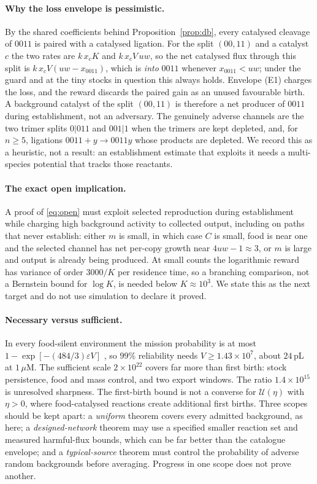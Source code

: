 \documentclass[11pt,letterpaper]{article}
\theoremstyle{plain}
\theoremstyle{definition}
\theoremstyle{remark}
\numberwithin{equation}{section}
\newcommand{\cU}{\mathcal U}
\newcommand{\eps}{\varepsilon}
\begin{document}
\paragraph{Why the loss envelope is pessimistic.}
By the shared coefficients behind Proposition~\ref{prop:db}, every catalysed cleavage of $0011$ is paired with a catalysed ligation. For the split $(00,11)$ and a catalyst $c$ the two rates are $k\,x_cK$ and $k\,x_cV\,uw$, so the net catalysed flux through this split is $k\,x_cV(uw-x_{0011})$, which is \emph{into} $0011$ whenever $x_{0011}<uw$; under the guard and at the tiny stocks in question this always holds. Envelope (E1) charges the loss, and the reward discards the paired gain as an unused favourable birth. A background catalyst of the split $(00,11)$ is therefore a net producer of $0011$ during establishment, not an adversary. The genuinely adverse channels are the two trimer splits $0|011$ and $001|1$ when the trimers are kept depleted, and, for $n\ge5$, ligations $0011+y\to0011y$ whose products are depleted. We record this as a heuristic, not a result: an establishment estimate that exploits it needs a multi-species potential that tracks those reactants.
\paragraph{The exact open implication.}
A proof of \eqref{eq:open} must exploit selected reproduction during establishment while charging high background activity to collected output, including on paths that never establish: either $m$ is small, in which case $C$ is small, food is near one and the selected channel has net per-copy growth near $4uw-1\approx3$, or $m$ is large and output is already being produced. At small counts the logarithmic reward has variance of order $3000/K$ per residence time, so a branching comparison, not a Bernstein bound for $\log K$, is needed below $K\approx10^3$. We state this as the next target and do not use simulation to declare it proved.

\paragraph{Necessary versus sufficient.}
In every food-silent environment the mission probability is at most $1-\exp[-(484/3)\eps V]$ \cite{twowindow2026}, so $99\%$ reliability needs $V\ge1.43\times10^7$, about $24$\,pL at $1\,\mu$M. The sufficient scale $2\times10^{22}$ covers far more than first birth: stock persistence, food and mass control, and two export windows. The ratio $1.4\times10^{15}$ is unresolved sharpness. The first-birth bound is not a converse for $\cU(\eta)$ with $\eta>0$, where food-catalysed reactions create additional first births. Three scopes should be kept apart: a \emph{uniform} theorem covers every admitted background, as here; a \emph{designed-network} theorem may use a specified smaller reaction set and measured harmful-flux bounds, which can be far better than the catalogue envelope; and a \emph{typical-source} theorem must control the probability of adverse random backgrounds before averaging. Progress in one scope does not prove another.
\end{document}
